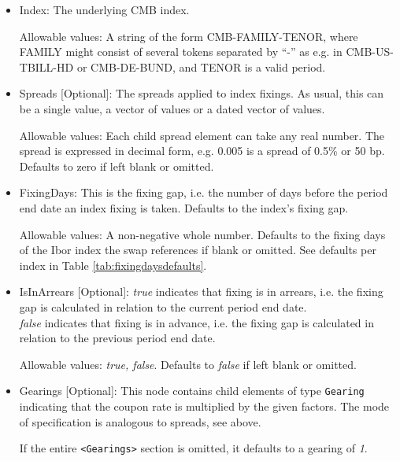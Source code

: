 \begin{itemize}
\item Index: The underlying CMB index.

Allowable values: A string of the form CMB-FAMILY-TENOR, where FAMILY might consist of several tokens separated by ``-'' as e.g. in CMB-US-TBILL-HD or CMB-DE-BUND, and TENOR is a valid period.

\item Spreads [Optional]: The spreads applied to index fixings. As usual, this can be a single value, a vector of values or a dated vector of
  values.
  
  Allowable values: Each child spread element can take any real number. The spread is expressed in decimal form, e.g. 0.005 is
  a spread of 0.5\% or 50 bp.  Defaults to zero if left blank or omitted.
    
\item FixingDays: This is the fixing gap, i.e. the number of days
  before the period end date an index fixing is taken. Defaults to the index's fixing gap.
  
    Allowable values: A non-negative whole number.  Defaults to the fixing days of the Ibor index the swap references if blank or omitted. See defaults per index in Table \ref{tab:fixingdaysdefaults}.

\item IsInArrears [Optional]:  \emph{true} indicates that  fixing is in arrears, 
  i.e. the fixing gap is calculated in relation to the current period
  end date.\\ \emph{false} indicates that  fixing is in advance,
  i.e. the fixing gap is calculated in relation to the previous period
  end date.
  
Allowable values:  \emph{true, false}. Defaults to \emph{false} if left blank or omitted.
    
\item Gearings [Optional]: This node contains child elements of type \lstinline!Gearing! indicating that the coupon rate is
  multiplied by the given factors. The mode of specification is analogous to spreads, see above.
  
  If the entire {\tt <Gearings>} section is omitted, it defaults to a gearing of \emph{1}.

\end{itemize}

